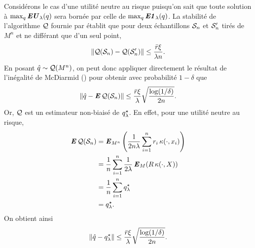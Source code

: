 \begin{lemme}
  \label{b:lem:qhnorm}
  Considérons le cas d'une utilité neutre au risque puisqu'on sait que toute solution à
  $\max_q\EU_\lambda(q)$ sera bornée par celle de $\max_q\EN_\lambda(q)$.  La stabilité de
  l'algorithme $\alg$ fournie par \cite{bousquet2002stability} établit que pour deux
  échantillons $\S_n$ et $\S_n'$ tirés de $M^n$ et ne différant que d'un seul point,
  \begin{equation}
    \|\alg(\S_n) - \alg(\S'_n)\| \leq \frac{\rmax\xi}{\lambda n}.
  \end{equation}
  En posant $\qh \sim \alg(M^n)$, on peut donc appliquer directement le résultat de
  l'inégalité de McDiarmid () pour obtenir avec probabilité
  $1-\delta$ que
  \begin{equation}
    \|\qh - \E\alg(\S_n)\| \leq \frac{\rmax\xi}{\lambda}\sqrt{\frac{\log(1/\delta)}{2n}}.
  \end{equation}
  Or, $\alg$ est un estimateur non-biaisé de $\qsl$. En effet, pour une utilité neutre au
  risque,
  \begin{align}
    \E\alg(\S_n) &= \E_{M^n}\left(\frac{1}{2n\lambda}\sumi r_i\,\kappa(\cdot,x_i)\right)\\
                 & =\frac{1}{n}\sumi \frac{1}{2\lambda}\E_M(R\,\kappa(\cdot,X))\\
                 & =\frac{1}{n}\sumi \qsl\\
                 &=\qsl.
  \end{align}
  On obtient ainsi
  \begin{equation}
    \|\qh - \qsl\| \leq \frac{\rmax\xi}{\lambda}\sqrt{\frac{\log(1/\delta)}{2n}}.
  \end{equation}
\end{lemme}



